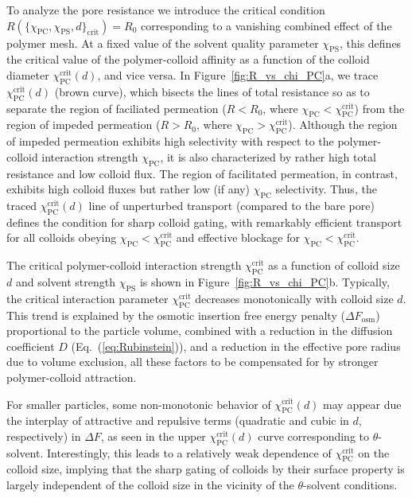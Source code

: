 \documentclass[12pt, a4paper]{article}
\begin{document}
To analyze the pore resistance we introduce the critical condition
\\$R(\{\chi_{\text{PC}}, \chi_{\text{PS}}, d\}_{\text{crit}}) = R_{0}$ corresponding to a vanishing combined effect of the polymer mesh. At a fixed value of the solvent quality parameter $\chi_{\text{PS}}$, this defines the critical value of the polymer-colloid affinity as a function of the colloid diameter $\chi_{\text{PC}}^{\text{crit}}(d)$, and vice versa.
In Figure~\ref{fig:R_vs_chi_PC}a, we trace $\chi_{\text{PC}}^{\text{crit}}(d)$ (brown curve), which bisects the lines of total resistance so as to separate the region of faciliated permeation ($R < R_{0}$, where $\chi_{\text{PC}} < \chi_{\text{PC}}^{\text{crit}}$) from the region of impeded permeation ($R > R_{0}$, where $\chi_{\text{PC}} > \chi_{\text{PC}}^{\text{crit}}$).
Although the region of impeded permeation exhibits high selectivity with respect to the polymer-colloid interaction strength $\chi_{\text{PC}}$, it is also characterized by rather high total resistance and low colloid flux.
The region of facilitated permeation, in contrast, exhibits high colloid fluxes but rather low (if any) $\chi_{\text{PC}}$ selectivity. 
Thus, the traced $\chi_{\text{PC}}^{\text{crit}}(d)$ line of unperturbed transport (compared to the bare pore) defines the condition for sharp colloid gating, with remarkably efficient transport for all colloids obeying $\chi_{\text{PC}} < \chi_{\text{PC}}^{\text{crit}}$ and effective blockage for $\chi_{\text{PC}} < \chi_{\text{PC}}^{\text{crit}}$.

The critical polymer-colloid interaction strength $\chi_{\text{PC}}^{\text{crit}}$ as a function of colloid size $d$ and solvent strength $\chi_{\text{PS}}$ is shown in Figure~\ref{fig:R_vs_chi_PC}b.
Typically, the critical interaction parameter $\chi_{\text{PC}}^{\text{crit}}$ decreases monotonically with colloid size $d$. 
This trend is explained by the osmotic insertion free energy penalty ($\Delta F_{\text{osm}}$) proportional to the particle volume, combined with a reduction in the diffusion coefficient $D$ (Eq.~(\ref{eq:Rubinstein})), and a reduction in the effective pore radius due to volume exclusion, all these factors to be compensated for by stronger polymer-colloid attraction. 

For smaller particles, some non-monotonic behavior of $\chi_{\text{PC}}^{\text{crit}}(d)$ may appear due the interplay of attractive and repulsive terms (quadratic and cubic in $d$, respectively) in $\Delta F$, as seen in the upper $\chi_{\text{PC}}^{\text{crit}}(d)$  curve corresponding to $\theta$-solvent. Interestingly, this leads to a relatively weak dependence of $\chi_{\text{PC}}^{\text{crit}}$ on the colloid size, implying that the sharp gating of colloids by their surface property is largely independent of the colloid size in the vicinity of the $\theta$-solvent conditions.
\end{document}
